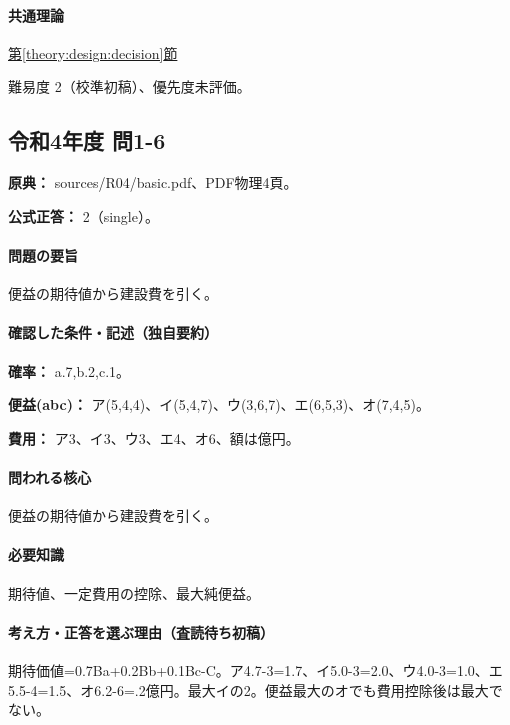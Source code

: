 \paragraph{共通理論} \hyperref[theory:design:decision]{第\ref*{theory:design:decision}節}

\par 難易度 2（校準初稿）、優先度未評価。

\subsection{令和4年度 問1-6}
\label{q:r04-reg-basic-1-6}

\noindent\textbf{原典：} sources/R04/basic.pdf、PDF物理4頁。

\textbf{公式正答：} 2（single）。

\paragraph{問題の要旨} 便益の期待値から建設費を引く。

\paragraph{確認した条件・記述（独自要約）}\mbox{}\par

\noindent\textbf{確率：} a.7,b.2,c.1。\par

\noindent\textbf{便益(abc)：} ア(5,4,4)、イ(5,4,7)、ウ(3,6,7)、エ(6,5,3)、オ(7,4,5)。\par

\noindent\textbf{費用：} ア3、イ3、ウ3、エ4、オ6、額は億円。\par

\paragraph{問われる核心} 便益の期待値から建設費を引く。

\paragraph{必要知識} 期待値、一定費用の控除、最大純便益。

\paragraph{考え方・正答を選ぶ理由（査読待ち初稿）} 期待価値=0.7Ba+0.2Bb+0.1Bc-C。ア4.7-3=\allowbreak{}1.7、イ5.0-3=\allowbreak{}2.0、ウ4.0-3=\allowbreak{}1.0、エ5.5-4=\allowbreak{}1.5、オ6.2-6=.2億円。最大イの2。便益最大のオでも費用控除後は最大でない。

